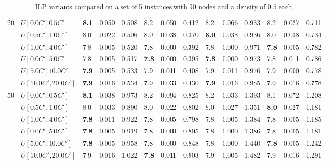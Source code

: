 \begin{table}[h]
{\begin{tabular}{|l|l||l|l|l||l|l|l||l|l|l||l|l|l|}
      \hline\hline
      \multirow{6}{*}{20} & $U[0.0C',0.5C']$ & \textbf{8.1} & 0.050 & 0.508 & 8.2 & 0.050 & 0.412 & 8.2 & 0.066 & 0.933 & 8.2 & 0.027 & 0.711 \\
       & $U[0.5C',1.0C']$ & 8.0 & 0.022 & 0.506 & 8.0 & 0.038 & 0.370 & \textbf{8.0} & 0.038 & 0.936 & 8.0 & 0.038 & 0.734 \\
       & $U[1.0C',4.0C']$ & 7.8 & 0.005 & 0.520 & 7.8 & 0.000 & 0.392 & 7.8 & 0.000 & 0.971 & \textbf{7.8} & 0.005 & 0.782 \\
       & $U[0.0C',5.0C']$ & 7.8 & 0.005 & 0.517 & \textbf{7.8} & 0.000 & 0.395 & \textbf{7.8} & 0.000 & 0.973 & 7.8 & 0.011 & 0.786 \\
       & $U[5.0C',10.0C']$ & \textbf{7.9} & 0.005 & 0.533 & 7.9 & 0.011 & 0.408 & 7.9 & 0.011 & 0.976 & 7.9 & 0.000 & 0.778 \\
       & $U[10.0C',20.0C']$ & \textbf{7.9} & 0.016 & 0.534 & 7.9 & 0.033 & 0.430 & \textbf{7.9} & 0.016 & 0.985 & 7.9 & 0.016 & 0.778 \\
      \hline\hline
      \multirow{6}{*}{50} & $U[0.0C',0.5C']$ & \textbf{8.1} & 0.038 & 0.973 & 8.2 & 0.094 & 0.825 & 8.2 & 0.033 & 1.393 & 8.1 & 0.072 & 1.208 \\
       & $U[0.5C',1.0C']$ & 8.0 & 0.033 & 0.890 & 8.0 & 0.022 & 0.802 & 8.0 & 0.027 & 1.351 & \textbf{8.0} & 0.027 & 1.181 \\
       & $U[1.0C',4.0C']$ & \textbf{7.8} & 0.011 & 0.922 & 7.8 & 0.005 & 0.798 & 7.8 & 0.005 & 1.384 & 7.8 & 0.005 & 1.185 \\
       & $U[0.0C',5.0C']$ & \textbf{7.8} & 0.005 & 0.919 & 7.8 & 0.000 & 0.805 & 7.8 & 0.000 & 1.386 & 7.8 & 0.005 & 1.181 \\
       & $U[5.0C',10.0C']$ & \textbf{7.8} & 0.005 & 0.958 & 7.8 & 0.000 & 0.848 & 7.8 & 0.000 & 1.440 & \textbf{7.8} & 0.005 & 1.242 \\
       & $U[10.0C',20.0C']$ & 7.9 & 0.016 & 1.022 & \textbf{7.8} & 0.011 & 0.903 & 7.9 & 0.005 & 1.482 & 7.9 & 0.016 & 1.291 \\
      \hline
      \end{tabular}
      }
      \caption{ILP variants compared on a set of 5 instances with $90$ nodes and a density of $0.5$ each.}
      \label{tab:pcpn90ILPVariant}
      \end{table}
      
